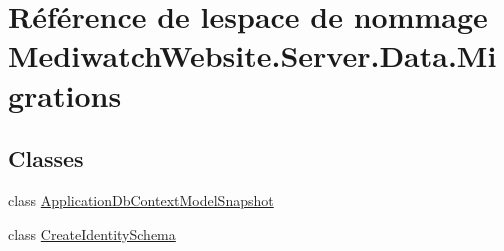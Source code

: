 \hypertarget{namespace_mediwatch_website_1_1_server_1_1_data_1_1_migrations}{}\section{Référence de l\textquotesingle{}espace de nommage Mediwatch\+Website.\+Server.\+Data.\+Migrations}
\label{namespace_mediwatch_website_1_1_server_1_1_data_1_1_migrations}
\subsection*{Classes}
\begin{DoxyCompactItemize}
\item 
class \hyperlink{class_mediwatch_website_1_1_server_1_1_data_1_1_migrations_1_1_application_db_context_model_snapshot}{Application\+Db\+Context\+Model\+Snapshot}
\item 
class \hyperlink{class_mediwatch_website_1_1_server_1_1_data_1_1_migrations_1_1_create_identity_schema}{Create\+Identity\+Schema}
\end{DoxyCompactItemize}
